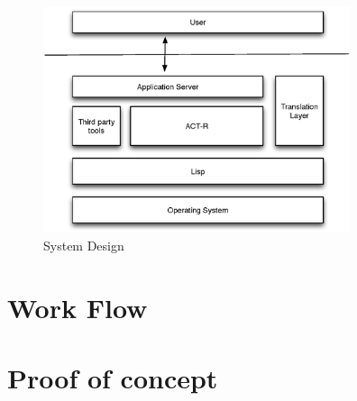 \begin{figure}[htp]
  \centering
  \includegraphics[width=90mm]{SystemOverview.eps}
  \caption{System Design}
  \label{SysOverview}
\end{figure}


\section{Work Flow}

\section{Proof of concept}

